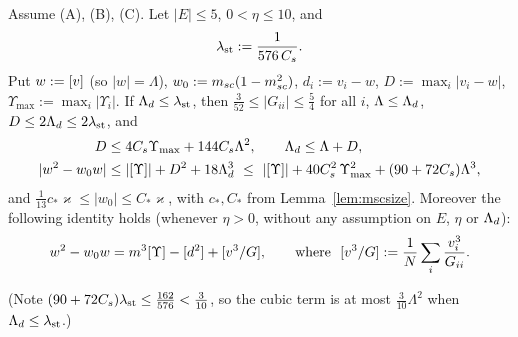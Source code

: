 \begin{lemma}\label{lem:stabnear}
Assume \textup{(A), (B), (C)}. Let $|E|\le5$, $0<\eta\le10$, and
\begin{equation}\label{eq:lambda1}
 \lambda_{\rm st}:=\frac1{576\,C_s}.
\end{equation}
Put $w:=[v]$ (so $|w|=\Lambda$), $w_0:=m_{sc}(1-m_{sc}^2)$, $d_i:=v_i-w$, $D:=\max_i|v_i-w|$, $\Upsilon_{\max}:=\max_i|\Upsilon_i|$. If $\Lambda_d\le\lambda_{\rm st}$, then $\frac3{52}\le|G_{ii}|\le\frac54$ for all $i$,
$\Lambda\le\Lambda_d$, $D\le2\Lambda_d\le2\lambda_{\rm st}$, and
\begin{align}
 D&\le4C_s\Upsilon_{\max}+144C_s\Lambda^2,\qquad\Ld\le\Lambda+D,\label{eq:Dbound}\\
 |w^2-w_0w|&\le|\avg\Upsilon|+D^2+18\Ld^3\ \le\ |\avg\Upsilon|+40C_s^2\,\Upsilon_{\max}^2+(90+72C_s)\Lambda^3,\label{eq:quad}
\end{align}
and $\frac1{13}c_*\varkappa\le|w_0|\le C_*\varkappa$, with $c_*,C_*$ from Lemma~\ref{lem:mscsize}. Moreover the following identity holds (whenever $\eta>0$, without any assumption on $E$, $\eta$ or $\Lambda_d$):
\[
 w^2-w_0w=m^3[\Upsilon]-[d^2]+[v^3/G],\qquad\text{where }\ [v^3/G]:=\frac1N\sum_i\frac{v_i^3}{G_{ii}} .
\]
\end{lemma}
\noindent(Note $(90+72C_s)\lambda_{\rm st}\le\frac{162}{576}<\frac3{10}$, so the cubic term is at most $\frac3{10}\Lambda^2$ when $\Lambda_d\le\lambda_{\rm st}$.)
